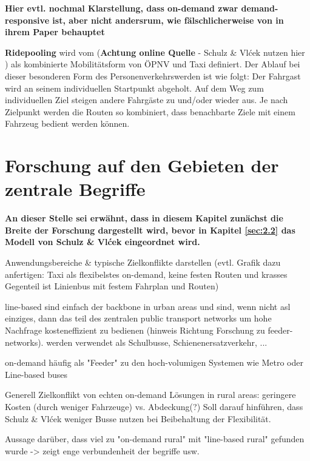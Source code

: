 \textbf{Hier evtl. nochmal Klarstellung, dass on-demand zwar demand-responsive ist, aber nicht andersrum, wie fälschlicherweise von \textcite{wang_multilevel_2014} in ihrem Paper behauptet}

\textbf{Ridepooling} wird vom \textcite{verband_der_automobilindustrie_ridepooling_2025} (\textbf{Achtung online Quelle} - Schulz \& Vlćek nutzen hier \parencite{vansteenwegen_survey_2022}) als kombinierte Mobilitätsform von ÖPNV und Taxi definiert. Der Ablauf bei dieser besonderen Form des Personenverkehrswerden ist wie folgt: Der Fahrgast wird an seinem individuellen Startpunkt abgeholt. Auf dem Weg zum individuellen Ziel steigen andere Fahrgäste zu und/oder wieder aus. Je nach Zielpunkt werden die Routen so kombiniert, dass benachbarte Ziele mit einem Fahrzeug bedient werden können.   
\section{Forschung auf den Gebieten der zentrale Begriffe}
\label{sec:2.1}
\label{sec:Kontext}

\textbf{An dieser Stelle sei erwähnt, dass in diesem Kapitel zunächst die Breite der Forschung dargestellt wird, bevor in Kapitel \ref{sec:2.2} das Modell von Schulz \& Vlćek eingeordnet wird.}

Anwendungsbereiche \& typische Zielkonflikte darstellen (evtl. Grafik dazu anfertigen: Taxi als flexibelstes on-demand, keine festen Routen und krasses Gegenteil ist Linienbus mit festem Fahrplan und Routen)

line-based sind einfach der backbone in urban areas und sind, wenn nicht asl einziges, dann das teil des zentralen public transport networks um hohe Nachfrage kosteneffizient zu bedienen (hinweis Richtung Forschung zu feeder-networks). werden verwendet als Schulbusse, Schienenersatzverkehr, ...

on-demand häufig als "Feeder" zu den hoch-volumigen Systemen wie Metro oder Line-based buses

Generell Zielkonflikt von echten on-demand Lösungen in rural areas: geringere Kosten (durch weniger Fahrzeuge) vs. Abdeckung(?) Soll darauf hinführen, dass Schulz \& Vlćek weniger Busse nutzen bei Beibehaltung der Flexibilität.

Aussage darüber, dass viel zu "on-demand rural" mit "line-based rural" gefunden wurde -> zeigt enge verbundenheit der begriffe usw.

